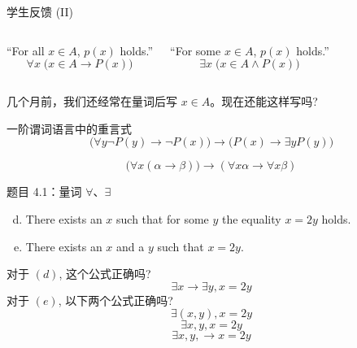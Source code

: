 \begin{frame}{学生反馈 (II)}
  \begin{columns}
      ``For all $x \in A$, $p(x)$ holds.''
      \[
	\forall x \; \Big(x \in A \to P(x)\Big)
      \]

      ``For some $x \in A$, $p(x)$ holds.''
      \[
	\exists x \; \Big(x \in A \land P(x)\Big)
      \]

  \end{columns}

  \vspace{0.30cm}
  \centerline{ 几个月前，我们还经常在量词后写 $x \in A$。现在还能这样写吗?}
\end{frame}

\begin{frame}{一阶谓词语言中的重言式}
  \[
    \Big(\forall y \lnot P(y) \to \lnot P(x)\Big) \to \Big(P(x) \to \exists y P(y)\Big)
  \]

  \[
    \Big(\forall x (\alpha \to \beta)\Big) \to (\forall x \alpha \to \forall x \beta)
  \]
\end{frame}


\begin{frame}{}
  \begin{exampleblock}{题目 4.1：量词 $\forall$、$\exists$}
    \begin{enumerate}[(a)]
      \setcounter{enumi}{3}
      \item There exists an $x$ such that for some $y$ the equality $x = 2y$ holds.
      \item There exists an $x$ and a $y$ such that $x = 2y$.
    \end{enumerate}
  \end{exampleblock}

  \vspace{0.60cm}
  \pause
  对于 $(d)$, 这个公式正确吗?
  \[
    \exists x \to \exists y, x = 2y
  \]
  \pause
  对于 $(e)$, 以下两个公式正确吗?
  \[
    \exists (x,y), x = 2y
  \]
  \vspace{-0.30cm}
  \[
    \exists x, y, x = 2y
  \]
  \vspace{-0.30cm}
  \[
    \exists x, y, \to x = 2y
  \]
\end{frame}

